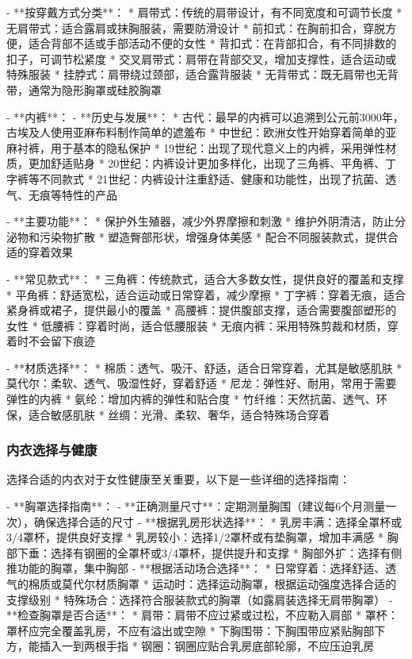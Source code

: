 \begin{enumerate}
  - **按穿戴方式分类**：
    * 肩带式：传统的肩带设计，有不同宽度和可调节长度
    * 无肩带式：适合露肩或抹胸服装，需要防滑设计
    * 前扣式：在胸前扣合，穿脱方便，适合背部不适或手部活动不便的女性
    * 背扣式：在背部扣合，有不同排数的扣子，可调节松紧度
    * 交叉肩带式：肩带在背部交叉，增加支撑性，适合运动或特殊服装
    * 挂脖式：肩带绕过颈部，适合露背服装
    * 无背带式：既无肩带也无背带，通常为隐形胸罩或硅胶胸罩

- **内裤**：
  - **历史与发展**：
    * 古代：最早的内裤可以追溯到公元前3000年，古埃及人使用亚麻布料制作简单的遮羞布
    * 中世纪：欧洲女性开始穿着简单的亚麻衬裤，用于基本的隐私保护
    * 19世纪：出现了现代意义上的内裤，采用弹性材质，更加舒适贴身
    * 20世纪：内裤设计更加多样化，出现了三角裤、平角裤、丁字裤等不同款式
    * 21世纪：内裤设计注重舒适、健康和功能性，出现了抗菌、透气、无痕等特性的产品

  - **主要功能**：
    * 保护外生殖器，减少外界摩擦和刺激
    * 维护外阴清洁，防止分泌物和污染物扩散
    * 塑造臀部形状，增强身体美感
    * 配合不同服装款式，提供合适的穿着效果

  - **常见款式**：
    * 三角裤：传统款式，适合大多数女性，提供良好的覆盖和支撑
    * 平角裤：舒适宽松，适合运动或日常穿着，减少摩擦
    * 丁字裤：穿着无痕，适合紧身裤或裙子，提供最小的覆盖
    * 高腰裤：提供腹部支撑，适合需要腹部塑形的女性
    * 低腰裤：穿着时尚，适合低腰服装
    * 无痕内裤：采用特殊剪裁和材质，穿着时不会留下痕迹

  - **材质选择**：
    * 棉质：透气、吸汗、舒适，适合日常穿着，尤其是敏感肌肤
    * 莫代尔：柔软、透气、吸湿性好，穿着舒适
    * 尼龙：弹性好、耐用，常用于需要弹性的内裤
    * 氨纶：增加内裤的弹性和贴合度
    * 竹纤维：天然抗菌、透气、环保，适合敏感肌肤
    * 丝绸：光滑、柔软、奢华，适合特殊场合穿着

\subsubsection{内衣选择与健康}

选择合适的内衣对于女性健康至关重要，以下是一些详细的选择指南：

- **胸罩选择指南**：
  - **正确测量尺寸**：定期测量胸围（建议每6个月测量一次），确保选择合适的尺寸
  - **根据乳房形状选择**：
    * 乳房丰满：选择全罩杯或3/4罩杯，提供良好支撑
    * 乳房较小：选择1/2罩杯或有垫胸罩，增加丰满感
    * 胸部下垂：选择有钢圈的全罩杯或3/4罩杯，提供提升和支撑
    * 胸部外扩：选择有侧推功能的胸罩，集中胸部
  - **根据活动场合选择**：
    * 日常穿着：选择舒适、透气的棉质或莫代尔材质胸罩
    * 运动时：选择运动胸罩，根据运动强度选择合适的支撑级别
    * 特殊场合：选择符合服装款式的胸罩（如露肩装选择无肩带胸罩）
  - **检查胸罩是否合适**：
    * 肩带：肩带不应过紧或过松，不应勒入肩部
    * 罩杯：罩杯应完全覆盖乳房，不应有溢出或空隙
    * 下胸围带：下胸围带应紧贴胸部下方，能插入一到两根手指
    * 钢圈：钢圈应贴合乳房底部轮廓，不应压迫乳房


\end{enumerate}

